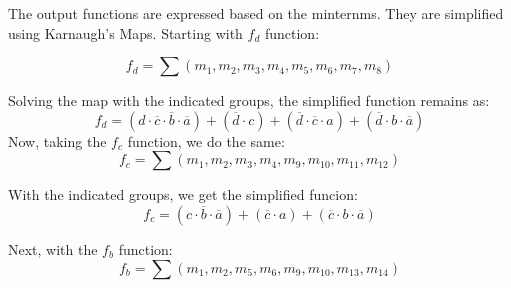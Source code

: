         \par
        The output functions are expressed based on the minternms.
        They are simplified using Karnaugh's Maps. Starting with $f_d$ function:\par
        \[
            f_{d}=\sum{(m_1,m_2,m_3,m_4,m_5,m_6,m_7,m_8)}
        \]
        \begin{centering}
            \begin{Karnaugh}
            \end{Karnaugh}
        \par\end{centering}
        Solving the map with the indicated groups, the simplified 
        function remains as:
        \[
            \boxed{f_{d}=(d \cdot \overline{c} \cdot \overline{b} \cdot \overline{a})+
            (\overline{d} \cdot c)+(\overline{d} \cdot \overline{c} \cdot a)+
            (\overline{d} \cdot b \cdot \overline{a})}    
        \]
        \newpage
        Now, taking the $f_c$ function, we do the same:
        \[
            f_{c}=\sum{(m_1,m_2,m_3,m_4,m_9,m_{10},m_{11},m_{12})}
        \]
        \begin{centering}
            \begin{Karnaugh}
            \end{Karnaugh}
        \par\end{centering}
        With the indicated groups, we get the simplified funcion:
        \[
            \boxed{f_c=(c \cdot \overline{b} \cdot \overline{a})+
            (\overline{c} \cdot a)+
            (\overline{c} \cdot b \cdot \overline{a})}    
        \]\par
        Next, with the $f_b$ function:
        \[
            f_{b}=\sum{(m_1,m_2,m_5,m_6,m_9,m_{10},m_{13},m_{14})}    
        \]
        \begin{centering}
            \begin{Karnaugh}
            \end{Karnaugh}
        \par\end{centering}
